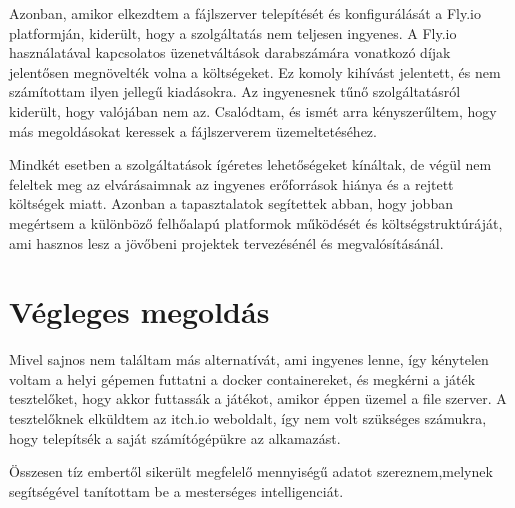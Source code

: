 Azonban, amikor elkezdtem a fájlszerver telepítését és konfigurálását a Fly.io platformján, kiderült, hogy a szolgáltatás nem teljesen ingyenes.
A Fly.io használatával kapcsolatos üzenetváltások darabszámára vonatkozó díjak jelentősen 
megnövelték volna a költségeket. Ez komoly kihívást jelentett, és nem számítottam ilyen jellegű kiadásokra. 
Az ingyenesnek tűnő szolgáltatásról kiderült, 
hogy valójában nem az. Csalódtam, és ismét arra kényszerűltem, hogy más megoldásokat keressek a fájlszerverem üzemeltetéséhez.

Mindkét esetben a szolgáltatások ígéretes lehetőségeket kínáltak, de végül nem feleltek meg az elvárásaimnak az ingyenes erőforrások hiánya és a rejtett költségek miatt. Azonban a tapasztalatok segítettek abban, hogy jobban megértsem a különböző felhőalapú platformok működését és költségstruktúráját, ami hasznos lesz a jövőbeni projektek tervezésénél és megvalósításánál.
\section{Végleges megoldás}
Mivel sajnos nem találtam más alternatívát, ami ingyenes lenne, így kénytelen voltam a helyi gépemen futtatni a docker containereket, és megkérni a játék tesztelőket, hogy akkor futtassák a játékot, amikor éppen üzemel a file szerver. A tesztelőknek elküldtem az itch.io weboldalt, így nem volt szükséges számukra, hogy telepítsék a saját számítógépükre az alkamazást.

Összesen tíz embertől sikerült megfelelő mennyiségű adatot szereznem,melynek segítségével tanítottam be a mesterséges intelligenciát.